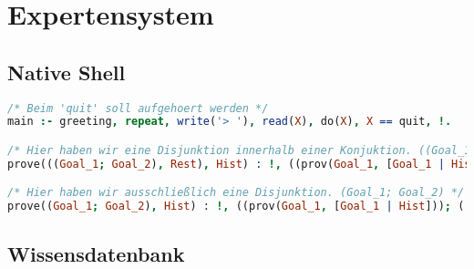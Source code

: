 \documentclass[12pt]{article}
\begin{document}
\section{Expertensystem}

\subsection{Native Shell}

\begin{lstlisting}[language=Prolog]
/* Beim 'quit' soll aufgehoert werden */
main :- greeting, repeat, write('> '), read(X), do(X), X == quit, !.

/* Hier haben wir eine Disjunktion innerhalb einer Konjuktion. ((Goal_1; Goal_2), Rest) */
prove(((Goal_1; Goal_2), Rest), Hist) :­ !, ((prov(Goal_1, [Goal_1 | Hist]), prove(Rest, Hist)); (!, prov(Goal_2, [Goal_2 | Hist]), prove(Rest, Hist))).

/* Hier haben wir ausschließlich eine Disjunktion. (Goal_1; Goal_2) */
prove((Goal_1; Goal_2), Hist) :­ !, ((prov(Goal_1, [Goal_1 | Hist])); (!, prov(Goal_2, [Goal_2 | Hist]))).
\end{lstlisting}

\newpage

\subsection{Wissensdatenbank}
\end{document}
